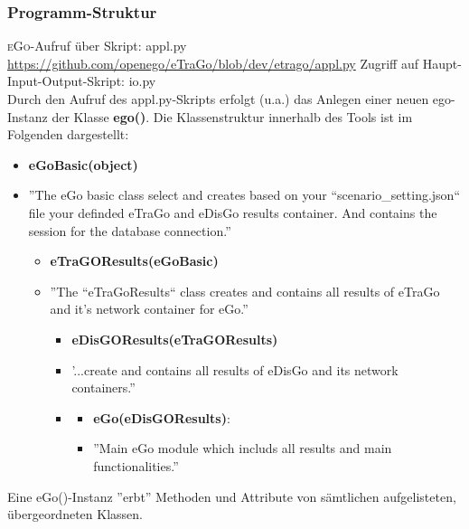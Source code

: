 \documentclass[
a4paper,     %
12pt         %
]{scrartcl}  %
\begin{document}
\subsubsection{Programm-Struktur}
\textsc{eGo}-Aufruf über Skript: appl.py\\
\url{https://github.com/openego/eTraGo/blob/dev/etrago/appl.py}
Zugriff auf Haupt-Input-Output-Skript: io.py\\

Durch den Aufruf des appl.py-Skripts erfolgt (u.a.) das Anlegen einer neuen ego-Instanz der Klasse \textbf{ego()}. Die Klassenstruktur innerhalb des Tools ist im Folgenden dargestellt:

\begin{itemize}
	\item[] \textbf{eGoBasic(object)}
	\item[] ''The eGo basic class select and creates based on your
	``scenario\_setting.json`` file  your definded eTraGo and
	eDisGo results container. And contains the session for the
	database connection.''

	\begin{itemize}
		\item[] \textbf{eTraGOResults(eGoBasic)}
		\item[] ''The ``eTraGoResults`` class creates and contains all results of eTraGo  and it's network container for eGo.''

		\begin{itemize}
			\item[] \textbf{eDisGOResults(eTraGOResults)}
			\item[] '...create and contains all results of eDisGo and its network containers.''
			\item[]
			\begin{itemize}
				\item[] \textbf{eGo(eDisGOResults)}:
				\item[] ''Main eGo module which includs all results and main functionalities.''
			\end{itemize}
		\end{itemize}
	\end{itemize}
\end{itemize}

Eine eGo()-Instanz ''erbt'' Methoden und Attribute von sämtlichen aufgelisteten, übergeordneten Klassen.
\end{document}
